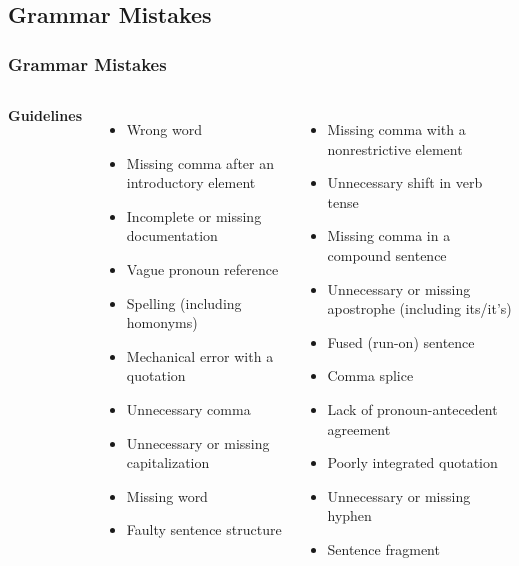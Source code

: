 \documentclass{beamer}
\begin{document}
\subsection{Grammar Mistakes}
\begin{frame}
\frametitle{Grammar Mistakes}
\begin{columns}[c] %

\textbf{Guidelines}
\begin{itemize}
\item Wrong word
\item Missing comma after an	introductory element
\item Incomplete or	missing documentation
\item Vague pronoun reference
\item Spelling (including homonyms)
\item Mechanical error with a quotation
\item Unnecessary comma
\item Unnecessary or missing	capitalization
\item Missing word
\item Faulty sentence structure
\end{itemize}

\begin{itemize}
\item Missing comma with a nonrestrictive element
\item Unnecessary shift in verb tense
\item Missing comma in a compound sentence
\item Unnecessary or missing apostrophe (including its/it’s)
\item Fused (run-on)	sentence
\item Comma splice
\item Lack of pronoun-antecedent	agreement
\item Poorly integrated quotation
\item Unnecessary or missing	hyphen
\item Sentence fragment
\end{itemize}
\end{columns}
\end{frame}
\end{document}
